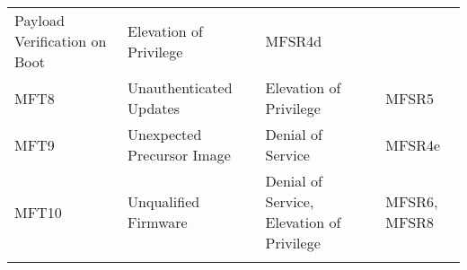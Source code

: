 \begin{longtable}[]{@{}llll@{}}
\begin{minipage}[t]{0.44\columnwidth}
Payload Verification on Boot\strut
\end{minipage} & \begin{minipage}[t]{0.30\columnwidth}\raggedright\strut
Elevation of Privilege\strut
\end{minipage} & \begin{minipage}[t]{0.09\columnwidth}\raggedright\strut
MFSR4d\strut
\end{minipage}\tabularnewline
\begin{minipage}[t]{0.05\columnwidth}\raggedright\strut
MFT8\strut
\end{minipage} & \begin{minipage}[t]{0.44\columnwidth}\raggedright\strut
Unauthenticated Updates\strut
\end{minipage} & \begin{minipage}[t]{0.30\columnwidth}\raggedright\strut
Elevation of Privilege\strut
\end{minipage} & \begin{minipage}[t]{0.09\columnwidth}\raggedright\strut
MFSR5\strut
\end{minipage}\tabularnewline
\begin{minipage}[t]{0.05\columnwidth}\raggedright\strut
MFT9\strut
\end{minipage} & \begin{minipage}[t]{0.44\columnwidth}\raggedright\strut
Unexpected Precursor Image\strut
\end{minipage} & \begin{minipage}[t]{0.30\columnwidth}\raggedright\strut
Denial of Service\strut
\end{minipage} & \begin{minipage}[t]{0.09\columnwidth}\raggedright\strut
MFSR4e\strut
\end{minipage}\tabularnewline
\begin{minipage}[t]{0.05\columnwidth}\raggedright\strut
MFT10\strut
\end{minipage} & \begin{minipage}[t]{0.44\columnwidth}\raggedright\strut
Unqualified Firmware\strut
\end{minipage} & \begin{minipage}[t]{0.30\columnwidth}\raggedright\strut
Denial of Service, Elevation of Privilege\strut
\end{minipage} & \begin{minipage}[t]{0.09\columnwidth}\raggedright\strut
MFSR6, MFSR8\strut
\end{minipage}\tabularnewline
\begin{minipage}[t]{0.05\columnwidth}\raggedright\strut

\end{minipage}
\end{longtable}

